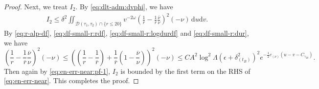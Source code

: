 \documentclass[10pt, reqno]{amsart}
\theoremstyle{definition}
\theoremstyle{remark}
\theoremstyle{conjecture}
\numberwithin{equation}{section}
\newcommand{\set}[1]{\{#1\}}
\newcommand{\ud}{\mathrm{d}}
\newcommand{\0}{\emptyset}
\newcommand{\gmm}{\gamma}
\newcommand{\dlt}{\delta}
\newcommand{\eps}{\epsilon}
\newcommand{\Lmb}{\Lambda}
\newcommand{\omg}{\omega}
\newcommand{\calD}{\mathcal D}
\newcommand{\dur}{\nu}
\newcommand{\durbg}{\overline{\dur}}				%
\newcommand{\rbg}{\overline{r}}					%
\begin{document}
\begin{proof}
Next, we treat $I_{2}$. By \eqref{eq:dlt-adm:dvphi}, we have
\begin{align*}
	I_{2} \leq \dlt^{2} \iint_{\calD(\tau_{1}, \tau_{2}) \cap \set{r \leq 20}} v^{-2 \omg} \left( \frac{1}{r} - \frac{1}{\rbg} \frac{\durbg}{\dur} \right)^{2} (-\dur) \, \ud u \ud v .
\end{align*}
By \eqref{eq:r-alp-df}, \eqref{eq:df-small-r:rdf}, \eqref{eq:df-small-r:logdurdf} and \eqref{eq:df-small-r:dur}, we have
\begin{equation*}
	\left( \frac{1}{r} - \frac{1}{\rbg} \frac{\durbg}{\dur} \right)^{2} (-\dur)
	\leq \left( \left(\frac{1}{r} - \frac{1}{\rbg} \right) + \frac{1}{\rbg} \left( 1 - \frac{\durbg}{\dur} \right)\right)^{2} (-\dur)
	\leq C A^{2} \log^{2} \Lmb \left( \eps + \dlt_{(t_{B})}^{2} \right)^{2} e^{- \frac{1}{2} c_{(\dur)} (u - v - C_{\gmm_{20}})}.
\end{equation*}
Then again by \eqref{eq:en-err-near:pf-1}, $I_{2}$ is bounded by the first term on the RHS of \eqref{eq:en-err-near}. This completes the proof. \qedhere
\end{proof}
\end{document}
